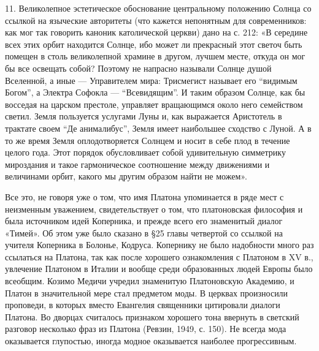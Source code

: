 11.  Великолепное  эстетическое   обоснование  центральному  положению
Солнца со ссылкой на языческие  авторитеты (что кажется непонятным для
современников: как мог так  говорить каноник католической церкви) дано
на с. 212: «В середине всех  этих орбит находится Солнце, ибо может ли
прекрасный этот  светоч быть  помещен в  столь великолепной  храмине в
другом, лучшем месте, откуда он мог  бы все освещать собой? Поэтому не
напрасно называли Солнце душой Вселенной, а иные --- Управителем мира:
Трисмегист  называет  его ``видимым  Богом'',  а  Электра Софокла  ---
``Всевидящим''. И  таким образом  Солнце, как  бы восседая  на царском
престоле, управляет  вращающимся около  него семейством  светил. Земля
пользуется услугами Луны и, как выражается Аристотель в трактате своем
``Де анималибус'', Земля имеет наибольшее сходство  с Луной. А в то же
время  Земля оплодотворяется  Солнцем и  носит в  себе плод  в течение
целого года. Этот порядок  обусловливает собой удивительную симметрику
мироздания  и  такое  гармоническое  соотношение  между  движениями  и
величинами орбит, какого мы другим образом найти не можем».

Все это, не говоря уже о том,  что имя Платона упоминается в ряде мест
с  неизменным  уважением,  свидетельствует  о  том,  что  платоновская
философия  и  была  источником  идей Коперника,  и  прежде  всего  его
знаменитый  диалог «Тимей».  Об  этом  уже было  сказано  в §25  главы
четвертой  со  ссылкой  на   учителя  Коперника  в  Болонье,  Кодруса.
Копернику не было  надобности много раз ссылаться на  Платона, так как
после хорошего ознакомления  с Платоном в XV в.,  увлечение Платоном в
Италии  и  вообще  среди  образованных  людей  Европы  было  всеобщим.
Козимо  Медичи  учредил  знаменитую Платоновскую  Академию,  и  Платон
в  значительной  мере  стал  предметом  моды.  В  церквах  произносили
проповеди, в  которых вместо  Евангелия священники  цитировали диалоги
Платона.  Во  дворцах считалось  признаком  хорошего  тона ввернуть  в
светский разговор несколько фраз из Платона (Ревзин, 1949, с. 150). Не
всегда мода оказывается глупостью,  иногда модное оказывается наиболее
прогрессивным.

